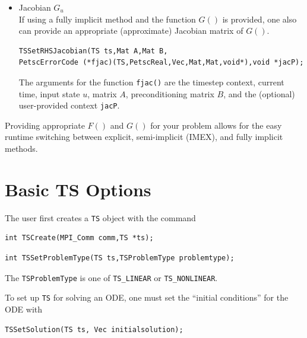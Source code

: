 \begin{itemize}
  For example, consider backward Euler's method applied to the ODE $ F(t, u, \dot{u}) = \dot{u} - f(t, u) $ with $ \dot{u} = (u^n - u^{n-1})/\delta t$ and
$ \frac{\partial \dot{u}}{\partial u}|_{u^n} = 1/\delta t $ resulting in
\begin{eqnarray*}
    \frac{d F}{d u^n} & = &   (1/\delta t)F_{\dot{u}} + F_u(t^n,u^n,\dot{u}^n).
\end{eqnarray*}
But $ F_{\dot{u}} = 1 $, in this special case, resulting in the expected Jacobian $ I/\delta t - f_u(t,u^n)$.

\item Jacobian $G_u$ \\
  If using a fully implicit method and the function $G()$ is provided, one also can provide an appropriate (approximate) Jacobian matrix of $G()$.
\begin{lstlisting}
TSSetRHSJacobian(TS ts,Mat A,Mat B,
PetscErrorCode (*fjac)(TS,PetscReal,Vec,Mat,Mat,void*),void *jacP);
\end{lstlisting}
  The arguments for the function \lstinline{fjac()}
  are the timestep context, current time, input state $u$, matrix $A$, preconditioning matrix
  $B$, and the (optional) user-provided context \lstinline{jacP}.
\end{itemize}

Providing appropriate $F()$ and $G()$ for your problem allows for the easy runtime switching between explicit, semi-implicit (IMEX), and fully implicit methods.

\section{Basic TS Options}

The user first creates a \lstinline{TS} object with the command
\begin{lstlisting}
int TSCreate(MPI_Comm comm,TS *ts);
\end{lstlisting}

\begin{lstlisting}
int TSSetProblemType(TS ts,TSProblemType problemtype);
\end{lstlisting}
The \lstinline{TSProblemType}
is one of \lstinline{TS_LINEAR} or \lstinline{TS_NONLINEAR}.

\noindent To set up \lstinline{TS} for solving an ODE, one must set the ``initial conditions'' for the ODE with
\begin{lstlisting}
TSSetSolution(TS ts, Vec initialsolution);
\end{lstlisting}

